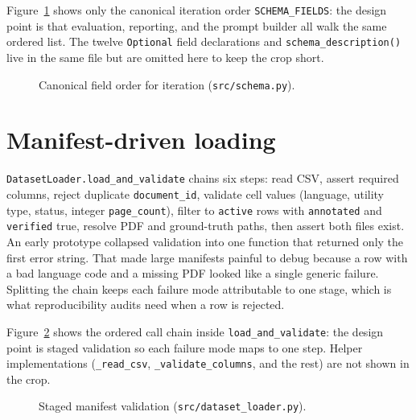 Figure~\ref{fig:impl-schema} shows only the canonical iteration order
\texttt{SCHEMA\_FIELDS}: the design point is that evaluation, reporting,
and the prompt builder all walk the same ordered list. The twelve
\texttt{Optional} field declarations and \texttt{schema\_description()}
live in the same file but are omitted here to keep the crop short.

\begin{figure}[ht]
    \centering
    \caption{Canonical field order for iteration (\texttt{src/schema.py}).}
    \label{fig:impl-schema}
\end{figure}


\section{Manifest-driven loading}
\label{sec:impl-loader}

\texttt{DatasetLoader.load\_and\_validate} chains six steps: read
CSV, assert required columns, reject duplicate
\texttt{document\_id}, validate cell values (language, utility type,
status, integer \texttt{page\_count}), filter to
\texttt{active} rows with \texttt{annotated} and \texttt{verified}
true, resolve PDF and ground-truth paths, then assert both files
exist. An early prototype collapsed validation into one function
that returned only the first error string. That made large
manifests painful to debug because a row with a bad language code
and a missing PDF looked like a single generic failure. Splitting
the chain keeps each failure mode attributable to one stage, which
is what reproducibility audits need when a row is rejected.

Figure~\ref{fig:impl-loader} shows the ordered call chain inside
\texttt{load\_and\_validate}: the design point is staged validation so
each failure mode maps to one step. Helper implementations
(\texttt{\_read\_csv}, \texttt{\_validate\_columns}, and the rest) are
not shown in the crop.

\begin{figure}[ht]
    \centering
    \caption{Staged manifest validation (\texttt{src/dataset\_loader.py}).}
    \label{fig:impl-loader}
\end{figure}

